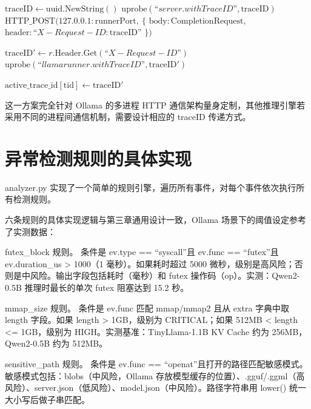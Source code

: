 \begin{algorithm}[H]
\caption{traceID 跨进程数据流}
\label{alg:traceid-flow}
\DontPrintSemicolon
{}

\BlankLine
{}
$\text{traceID} \leftarrow \text{uuid.NewString}()$ 
$\text{uprobe}(“server.withTraceID”, \text{traceID})$ 
$\text{HTTP\_POST}(127.0.0.1:\text{runnerPort},\ \{$
    $\text{body}: \text{CompletionRequest},\ $
    $\text{header}: “X-Request-ID: \text{traceID}”$
$\})$

\BlankLine
{}
$\text{traceID}' \leftarrow r.\text{Header.Get}(“X-Request-ID”)$ 
$\text{uprobe}(“llamarunner.withTraceID”, \text{traceID}')$ 

\BlankLine
{}
$\text{active\_trace\_id}[\text{tid}] \leftarrow \text{traceID}'$ 
\end{algorithm}

这一方案完全针对 Ollama 的多进程 HTTP 通信架构量身定制，其他推理引擎若采用不同的进程间通信机制，需要设计相应的 traceID 传递方式。

\section{异常检测规则的具体实现}

analyzer.py 实现了一个简单的规则引擎，遍历所有事件，对每个事件依次执行所有检测规则。

六条规则的具体实现逻辑与第三章通用设计一致，Ollama 场景下的阈值设定参考了实测数据：

futex\_block 规则。 条件是 ev.type == “syscall”且 ev.func == “futex”且 ev.duration\_us > 1000（1 毫秒）。如果耗时超过 5000 微秒，级别是高风险；否则是中风险。输出字段包括耗时（毫秒）和 futex 操作码（op）。实测：Qwen2-0.5B 推理时最长的单次 futex 阻塞达到 15.2 秒。

mmap\_size 规则。 条件是 ev.func 匹配 mmap/mmap2 且从 extra 字典中取 length 字段。如果 length > 1GB，级别为 CRITICAL；如果 512MB < length <= 1GB，级别为 HIGH。实测基准：TinyLlama-1.1B KV Cache 约为 256MB，Qwen2-0.5B 约为 512MB。

sensitive\_path 规则。 条件是 ev.func == “openat”且打开的路径匹配敏感模式。敏感模式包括：blobs（中风险，Ollama 存放模型缓存的位置）、.gguf/.ggml（高风险）、server.json（低风险）、model.json（中风险）。路径字符串用 lower() 统一大小写后做子串匹配。

